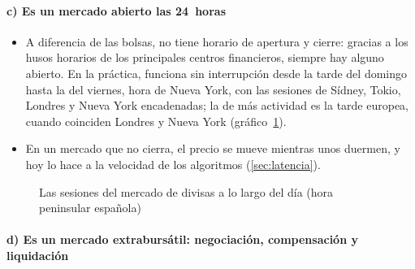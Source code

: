 \documentclass[11pt]{article}
\begin{document}
\paragraph{c) Es un mercado abierto las 24~horas}

\begin{itemize}
\item A diferencia de las bolsas, no tiene horario de apertura y cierre: gracias a los husos horarios de los principales centros financieros, siempre hay alguno abierto. En la práctica, funciona sin interrupción desde la tarde del domingo hasta la del viernes, hora de Nueva York, con las sesiones de Sídney, Tokio, Londres y Nueva York encadenadas; la de más actividad es la tarde europea, cuando coinciden Londres y Nueva York (gráfico~\ref{fig:sesiones}).
\item En un mercado que no cierra, el precio se mueve mientras unos duermen, y hoy lo hace a la velocidad de los algoritmos (\ref{sec:latencia}).
\end{itemize}

\begin{figure}[H]
\centering
\caption{Las sesiones del mercado de divisas a lo largo del día (hora peninsular española)}\label{fig:sesiones}
\end{figure}

\paragraph{d) Es un mercado extrabursátil: negociación, compensación y liquidación}\label{sec:otc}
\end{document}
